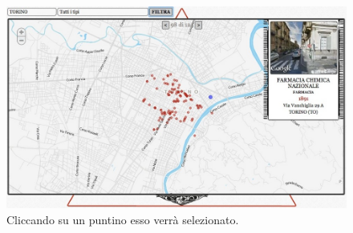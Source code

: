 \begin{figure}[ht!]
	\caption{Cliccando su un puntino esso verr\`a selezionato.}
	\centering
		\includegraphics[width=\textwidth]{img/s13.jpg}
\end{figure}